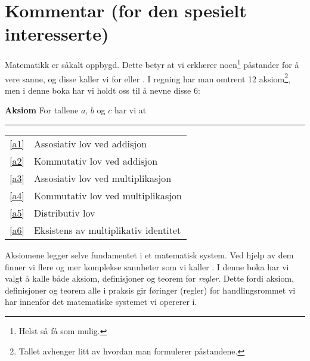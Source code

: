 




	
\section*{Kommentar (for den spesielt interesserte) \label{Kommentar1}}
Matematikk er såkalt  oppbygd. Dette betyr at vi erklærer noen\footnote{Helst så få som mulig.} påstander for å vere sanne, og disse kaller vi for  eller . I regning har man omtrent 12 aksiom\footnote{Tallet avhenger litt av hvordan man formulerer påstandene.}, men i denne boka har vi holdt oss til å nevne disse 6:
\regv 

\begin{tcolorbox}[boxrule=0.3 mm,arc=0mm,colback=blue!5] {\large \textbf{Aksiom} \vspace{5 pt}}\newline
For tallene $ a $, $ b $ og $ c $ har vi at
\rule{1\linewidth}{0.75bp}
\begin{center}
	\begin{tabular}{rl}
		\eqref{a1} &Assosiativ lov ved addisjon\\
		\eqref{a2} & Kommutativ lov ved addisjon \\	
		\eqref{a3} & Assosiativ lov ved multiplikasjon \\
		\eqref{a4} & Kommutativ lov ved multiplikasjon \\		
		\eqref{a5} & Distributiv lov\\	
		\eqref{a6} & Eksistens av multiplikativ identitet
	\end{tabular}
\end{center}
\end{tcolorbox}
\vsk
Aksiomene legger selve fundamentet i et matematisk system. Ved hjelp av dem finner vi flere og mer komplekse sannheter som vi kaller . I denne boka har vi valgt å kalle både aksiom, definisjoner og teorem for \textsl{regler}. Dette fordi aksiom, definisjoner og teorem alle i praksis gir føringer (regler) for handlingsrommet vi har innenfor det matematiske systemet vi opererer i.\vsk
